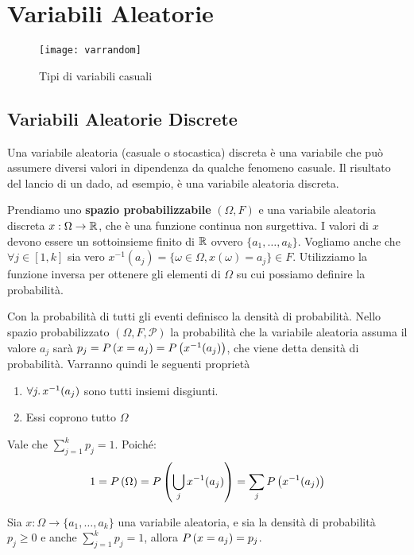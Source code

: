\chapter{Variabili Aleatorie}

\begin{figure}[H]
	\centering
	\caption{Tipi di variabili casuali}
	\texttt{[image: varrandom]}
\end{figure}

\section{Variabili Aleatorie Discrete}

Una variabile aleatoria (casuale o stocastica) discreta è una variabile che può assumere diversi valori in dipendenza da qualche fenomeno casuale.
Il risultato del lancio di un dado, ad esempio, è una variabile aleatoria discreta.

Prendiamo uno \textbf{spazio probabilizzabile} $ (\Omega, F) $ e una variabile aleatoria discreta $ x : \Omega \to \mathbb{R} $, che è una funzione continua non surgettiva. I valori di $ x $ devono essere un sottoinsieme finito di $ \mathbb{R} $ ovvero $ \{a_1, \dots, a_k\} $.
Vogliamo anche che $ \forall j \in [1, k] $ sia vero $ x^{-1}(a_j) = \{ \omega \in \Omega, x(\omega) = a_j\} \in F $. Utilizziamo la funzione inversa per ottenere gli elementi di $ \Omega $ su cui possiamo definire la probabilità.

Con la probabilità di tutti gli eventi definisco la densità di probabilità. Nello spazio probabilizzato $ (\Omega, F, \mathcal{P}) $ la probabilità che la variabile aleatoria assuma il valore $ a_j $ sarà $ p_j = P\left(x = a_j\right) = P\left(x^{-1}(a_j)\right) $, che viene detta densità di probabilità. Varranno quindi le seguenti proprietà

\begin{enumerate}
	\item $ \forall j \ldotp x^{-1} (a_j) $ sono tutti insiemi disgiunti.
	\item Essi coprono tutto $ \Omega $
\end{enumerate}

Vale che $ \sum_{j=1}^{k} p_j = 1 $. Poiché:
\[ 1 = P\left(\Omega\right) = P\left(\bigcup_{j} x^{-1}(a_j)\right) = \sum_{j} P\left(x^{-1}(a_j)\right)\] 

Sia $ x : \Omega \to \{ a_1, \dots, a_k \} $ una variabile aleatoria, e sia la densità di probabilità $ p_j \geq 0 $ e anche  $ \sum_{j=1}^{k} p_j = 1 $, allora $ P\left(x = a_j\right) = p_j $.

